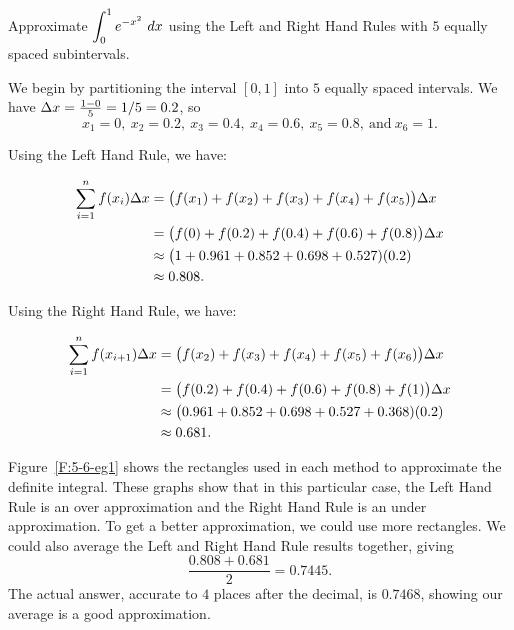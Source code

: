 \begin{example} \label{eg:5.6.1} %
Approximate $\displaystyle \int_0^1e^{-x^2}\ dx$ using the Left and Right Hand Rules with $5$ equally spaced subintervals.

\solution We begin by partitioning the interval $[0,1]$ into $5$ equally spaced intervals. We have $\Delta x = \frac{1-0}5 = 1/5=0.2$, so $$x_1 = 0,\ x_2 = 0.2,\ x_3 = 0.4,\ x_4 = 0.6,\ x_5 = 0.8,\ \text{and}\ x_6 = 1.$$

Using the Left Hand Rule, we have:

\begin{align*}
\sum_{i=1}^n f(x_i)\Delta x &= \big(f(x_1)+f(x_2) + f(x_3) + f(x_4) + f(x_5)\big)\Delta x \\
&= \big(f(0) + f(0.2) + f(0.4) + f(0.6) + f(0.8)\big)\Delta x \\
&\approx \big(1+0.961 + 0.852 + 0.698 + 0.527)(0.2)\\
&\approx 0.808.
\end{align*}

Using the Right Hand Rule, we have:

\begin{align*}
\sum_{i=1}^n f(x_{i+1})\Delta x &= \big(f(x_2) + f(x_3) + f(x_4) + f(x_5)+f(x_6)\big)\Delta x \\
&= \big(f(0.2) + f(0.4) + f(0.6) + f(0.8)+f(1)\big)\Delta x \\
&\approx \big(0.961 +0.852 + 0.698 + 0.527 + 0.368)(0.2)\\
&\approx 0.681.
\end{align*}

Figure~\ref{F:5-6-eg1} shows the rectangles used in each method to approximate the definite integral. These graphs show that in this particular case, the Left Hand Rule is an over approximation and the Right Hand Rule is an under approximation. To get a better approximation, we could use more rectangles. We could also average the Left and Right Hand Rule results together, giving $$ \frac{0.808 + 0.681}{2} = 0.7445.$$ The actual answer, accurate to $4$ places after the decimal, is $0.7468$, showing our average is a good approximation.
\end{example}

